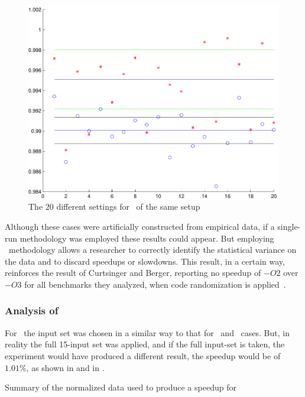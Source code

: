 \begin{figure}
  \centering
  \includegraphics[width=1.00\linewidth]{Figures/gzipfdll}
  \caption{The $20$ different settings for \gzip\ of the same setup}
  \label{fig:gzipfdll}
\end{figure}

Although these cases were artificially constructed from empirical data, if a single-run methodology was employed these results could appear. But employing \CP\ methodology allows a researcher to correctly identify the statistical variance on the data and to discard speedups or slowdowns. This result, in a certain way, reinforces the result of Curtsinger and Berger, reporting no speedup of $-O2$ over $-O3$ for all benchmarks they analyzed, when code randomization is applied~\cite{Curtsinger2013}.


\subsubsection{Analysis of \gobmk}

For \gobmk\ the input set was chosen in a similar way to that for \bzip\ and \gzip\ cases. But, in reality the full 15-input set was applied, and if the full input-set is taken, the experiment would have produced a different result, the speedup would be of $1.01 \%$, as shown in  and in .

\begin{table}
  \centering
  \begin{tiny}
  
  \end{tiny}
  \caption{Summary of the normalized data used to produce a speedup for \gcc}
  \label{tab:fullspeedupgbk}
\end{table}

